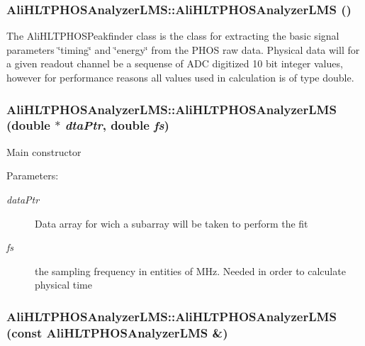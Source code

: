 \subsubsection{\setlength{\rightskip}{0pt plus 5cm}Ali\-HLTPHOSAnalyzer\-LMS::Ali\-HLTPHOSAnalyzer\-LMS ()}\label{classAliHLTPHOSAnalyzerLMS_a0}


The Ali\-HLTPHOSPeakfinder class is the class for extracting the basic signal parameters \char`\"{}timing\char`\"{} and \char`\"{}energy\char`\"{} from the PHOS raw data. Physical data will for a given readout channel be a sequense of ADC digitized 10 bit integer values, however for performance reasons all values used in calculation is of type double. 
\subsubsection{\setlength{\rightskip}{0pt plus 5cm}Ali\-HLTPHOSAnalyzer\-LMS::Ali\-HLTPHOSAnalyzer\-LMS (double $\ast$ {\em dta\-Ptr}, double {\em fs})}\label{classAliHLTPHOSAnalyzerLMS_a1}


Main constructor \begin{Desc}
\item[Parameters:]
\begin{description}
\item[{\em data\-Ptr}]Data array for wich a subarray will be taken to perform the fit \item[{\em fs}]the sampling frequency in entities of MHz. Needed in order to calculate physical time \end{description}
\end{Desc}
\subsubsection{\setlength{\rightskip}{0pt plus 5cm}Ali\-HLTPHOSAnalyzer\-LMS::Ali\-HLTPHOSAnalyzer\-LMS (const {\bf Ali\-HLTPHOSAnalyzer\-LMS} \&)}\label{classAliHLTPHOSAnalyzerLMS_a2}


